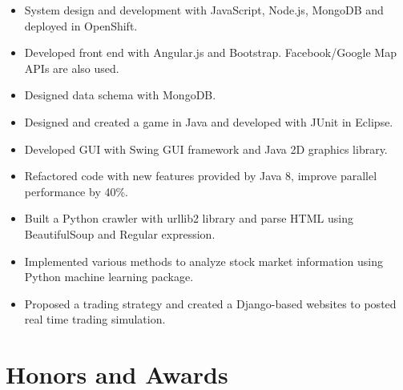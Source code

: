 \documentclass{resume}
\begin{document}


\begin{itemize}
  \item System design and development with JavaScript, Node.js, MongoDB and deployed in OpenShift.
  \item Developed front end with Angular.js and Bootstrap. Facebook/Google Map APIs are also used.
  \item Designed data schema with MongoDB.
\end{itemize}



\begin{itemize}
  \item Designed and created a game in Java and developed with JUnit in Eclipse.
  \item Developed GUI with Swing GUI framework and Java 2D graphics library.
  \item Refactored code with new features provided by Java 8, improve parallel performance by 40\%.  
\end{itemize}


\begin{itemize}
  \item Built a Python crawler with urllib2 library and parse HTML using BeautifulSoup and Regular expression.
  \item Implemented various methods to analyze stock market information using Python machine learning package.
  \item Proposed a trading strategy and created a Django-based websites to posted real time trading simulation.
\end{itemize}





\section{Honors and Awards}

\end{document}
